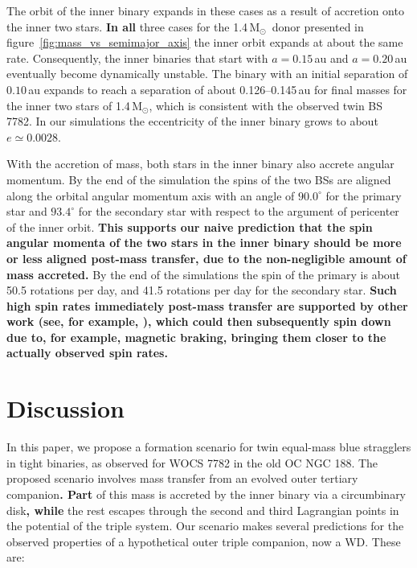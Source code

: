 \documentclass[twocolumn]{aastex62}
\newcommand{\MSun}{\mbox{M$_\odot$}}
\begin{document}
The orbit of the inner binary expands in these cases as a result of
accretion onto the inner two stars. \textbf{In all} three cases for the
1.4\,\MSun\, donor presented in
figure~\ref{fig:mass_vs_semimajor_axis} the inner orbit expands at
about the same rate. Consequently, the inner binaries that start with
$a = 0.15$\,au and $a=0.20$\,au eventually become dynamically
unstable.  The binary with an initial separation of $0.10$\,au expands
to reach a separation of about 0.126--0.145\,au for final masses for
the inner two stars of 1.4\,\MSun, which is consistent with the
observed twin BS 7782. In our simulations the eccentricity of the
inner binary grows to about $e \simeq 0.0028$.

With the accretion of mass, both stars in the inner binary also
accrete angular momentum.  By the end of the simulation the spins of
the two BSs are aligned along the orbital angular momentum axis with
an angle of $90.0^\circ$ for the primary star and $93.4^\circ$ for the
secondary star with respect to the argument of pericenter of the inner
orbit.  \textbf{This supports our naive prediction that the spin angular momenta of the two stars in the inner binary should be more or less aligned post-mass transfer, due to the non-negligible amount of mass accreted.} By the end of the simulations the spin of the primary is about
50.5 rotations per day, and 41.5 rotations per day for the secondary
star.  \textbf{Such high spin rates immediately post-mass transfer are supported by other work (see, for example, \citet{2014MNRAS.438.1909D}), which could then subsequently spin down due to, for example, magnetic braking, bringing them closer to the actually observed spin rates.}

\section{Discussion} \label{sect:discussion}

In this paper, we propose a formation scenario for twin equal-mass
blue stragglers in tight binaries, as observed for WOCS 7782 in the
old OC NGC 188.  The proposed scenario involves mass transfer from an
evolved outer tertiary companion\textbf{. Part} of this mass is accreted by the
inner binary via a circumbinary disk\textbf{, while} the rest escapes through the
second and third Lagrangian points in the potential of the triple
system.  Our scenario makes several predictions for the observed
properties of a hypothetical outer triple companion, now a WD.  These
are:
\end{document}
